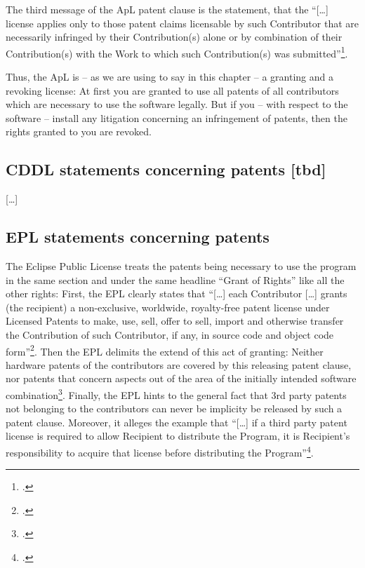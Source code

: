 The third message of the ApL patent clause is the statement, that the
\enquote{[\ldots] license applies only to those patent claims licensable by such
Contributor that are necessarily infringed by their Contribution(s) alone or by
combination of their Contribution(s) with the Work to which such Contribution(s)
was submitted}\footcite[cf.][\nopage wp §3]{Apl20OsiLicense2004a}.

Thus, the ApL is -- as we are using to say in this chapter -- a granting and a
revoking license: At first you are granted to use all patents of all
contributors which are necessary to use the software legally. But if you -- with
respect to the software -- install any litigation concerning an infringement of
patents, then the rights granted to you are revoked.

\subsection{CDDL statements concerning patents [tbd]}\label{subsec:CddlPatentClause}
[\ldots]

\subsection{EPL statements concerning patents}\label{subsec:EpLPatentClause}

The Eclipse Public License treats the patents being necessary to use the program
in the same section and under the same headline \enquote{Grant of Rights} like
all the other rights: First, the EPL clearly states that \enquote{[\ldots] each
Contributor [\ldots] grants (the recipient) a non-exclusive, worldwide,
royalty-free patent license under Licensed Patents to make, use, sell, offer to
sell, import and otherwise transfer the Contribution of such Contributor, if
any, in source code and object code form}\footcite[cf.][\nopage wp
§2.b]{Epl10OsiLicense2005a}. Then the EPL delimits the extend of this act of
granting: Neither hardware patents of the contributors are covered by this
releasing patent clause, nor patents that concern aspects out of the area of the
initially intended software combination\footcite[cf.][\nopage wp
§2.b]{Epl10OsiLicense2005a}. Finally, the EPL hints to the general fact that
3rd party patents not belonging to the contributors can never be implicity be
released by such a patent clause. Moreover, it alleges the example that
\enquote{[\ldots] if a third party patent license is required to allow Recipient
to distribute the Program, it is Recipient's responsibility to acquire that
license before distributing the Program}\footcite[cf.][\nopage wp
§2.c]{Epl10OsiLicense2005a}.


